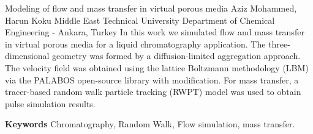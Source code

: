 
    \begin{abstract_online}{Modeling of flow and mass transfer in virtual porous media}{%
        Aziz Mohammed, Harun Koku}{%
        }{%
        Middle East Technical University Department of Chemical Engineering - Ankara, Turkey}
    In this work we simulated flow and mass transfer in virtual porous media for a liquid chromatography application. The three-dimensional geometry was formed by a diffusion-limited aggregation approach. The velocity field was obtained using the lattice Boltzmann methodology (LBM) via the PALABOS open-source library with modification. For mass transfer, a tracer-based random walk particle tracking (RWPT) model was used to obtain pulse simulation results. 
    
        \textbf{Keywords} \newline{}Chromatography, Random Walk, Flow simulation, mass transfer.
    \end{abstract_online}
    